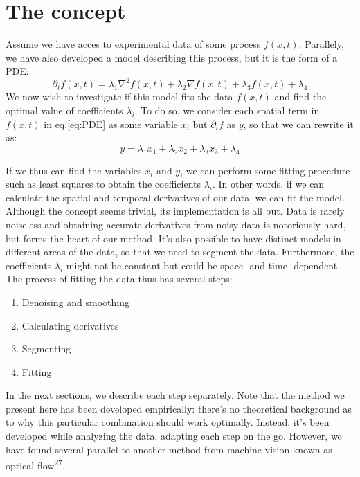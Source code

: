 \documentclass[12pt,a4paper,]{Dissertate}
\providecommand{\tightlist}{%
  \setlength{\itemsep}{0pt}\setlength{\parskip}{0pt}}
\begin{document}
\hypertarget{the-concept}{%
\section{The concept}\label{the-concept}}

Assume we have acces to experimental data of some process \(f(x,t)\).
Parallely, we have also developed a model describing this process, but
it is the form of a PDE: \begin{equation}
\partial_t f(x,t) = \lambda_1 \nabla^2f(x,t)+\lambda_2\nabla f(x,t) +\lambda_3 f(x,t) +\lambda_4
\label{eq:PDE}\end{equation} We now wish to investigate if this model
fits the data \(f(x,t)\) and find the optimal value of coefficients
\(\lambda_i\). To do so, we consider each spatial term in \(f(x,t)\) in
eq.\ref{eq:PDE} as some variable \(x_i\) but \(\partial_t f\) as \(y\),
so that we can rewrite it as: \[
y = \lambda_1 x_1+\lambda_2x_2 +\lambda_3 x_3 +\lambda_4
\]

If we thus can find the variables \(x_i\) and \(y\), we can perform some
fitting procedure such as least squares to obtain the coefficients
\(\lambda_i\). In other words, if we can calculate the spatial and
temporal derivatives of our data, we can fit the model. Although the
concept seems trivial, its implementation is all but. Data is rarely
noiseless and obtaining accurate derivatives from noisy data is
notoriously hard, but forms the heart of our method. It's also possible
to have distinct models in different areas of the data, so that we need
to segment the data. Furthermore, the coefficients \(\lambda_i\) might
not be constant but could be space- and time- dependent. The process of
fitting the data thus has several steps:

\begin{enumerate}
\def\labelenumi{\arabic{enumi}.}
\tightlist
\item
  Denoising and smoothing
\item
  Calculating derivatives
\item
  Segmenting
\item
  Fitting
\end{enumerate}

In the next sections, we describe each step separately. Note that the
method we present here has been developed empirically: there's no
theoretical background as to why this particular combination should work
optimally. Instead, it's been developed while analyzing the data,
adapting each step on the go. However, we have found several parallel to
another method from machine vision known as optical
flow\textsuperscript{27}.
\end{document}
